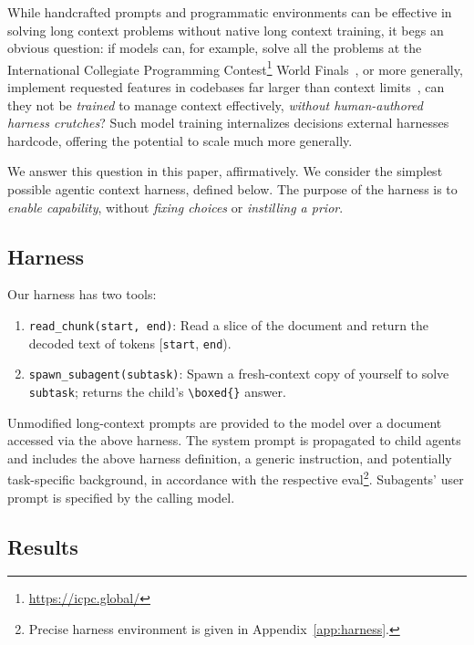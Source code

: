 \documentclass{article} %
\begin{document}
While handcrafted prompts and programmatic environments can be effective in solving long context problems without native long context training, it begs an obvious question: if models can, for example, solve all the problems at the International Collegiate Programming Contest\footnote{\url{https://icpc.global/}} World Finals~\citep{openai2025icpc}, or more generally, implement requested features in codebases far larger than context limits~\citep{marten2026terminalbench,openai2026gpt6astra,anthropic2026fablemythos51}, can they not be \emph{trained} to manage context effectively, \emph{without human-authored harness crutches}? Such model training internalizes decisions external harnesses hardcode, offering the potential to scale much more generally.

We answer this question in this paper, affirmatively. We consider the simplest possible agentic context harness, defined below. The purpose of the harness is to \emph{enable capability}, without \emph{fixing choices} or \emph{instilling a prior}.

\pagebreak

\subsection{Harness}

Our harness has two tools:

\begin{enumerate}
  \item \verb|read_chunk(start, end)|: Read a slice of the document and return the decoded text of tokens [\verb|start|, \verb|end|).
  \item \verb|spawn_subagent(subtask)|: Spawn a fresh-context copy of yourself to solve \verb|subtask|; returns the child's \verb|\boxed{}| answer.
\end{enumerate}

Unmodified long-context prompts are provided to the model over a document accessed via the above harness. The system prompt is propagated to child agents and includes the above harness definition, a generic instruction, and potentially task-specific background, in accordance with the respective eval\footnote{Precise harness environment is given in Appendix~\ref{app:harness}.}. Subagents' user prompt is specified by the calling model.

\subsection{Results}
\end{document}
